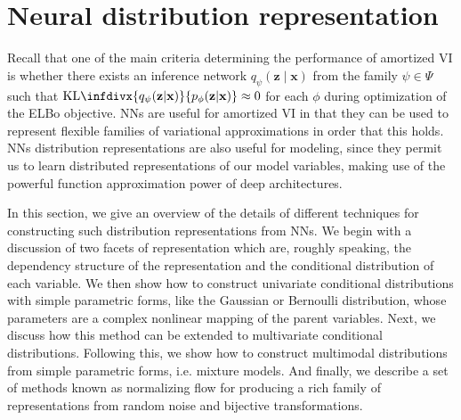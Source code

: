\section{Neural distribution representation}
Recall that one of the main criteria determining the performance of amortized VI is whether there exists an inference network $q_\psi(\mathbf{z}\mid\mathbf{x})$ from the family $\psi\in\Psi$ such that $\text{KL}\infdivx{q_\psi(\mathbf{z}|\mathbf{x})}{p_\phi(\mathbf{z}|\mathbf{x})}\approx0$ for each $\phi$ during optimization of the ELBo objective. NNs are useful for amortized VI in that they can be used to represent flexible families of variational approximations in order that this holds. NNs distribution representations are also useful for modeling, since they permit us to learn distributed representations of our model variables, making use of the powerful function approximation power of deep architectures.

In this section, we give an overview of the details of different techniques for constructing such distribution representations from NNs. We begin with a discussion of two facets of representation which are, roughly speaking, the dependency structure of the representation and the conditional distribution of each variable. We then show how to construct univariate conditional distributions with simple parametric forms, like the Gaussian or Bernoulli distribution, whose parameters are a complex nonlinear mapping of the parent variables. Next, we discuss how this method can be extended to multivariate conditional distributions. Following this, we show how to construct multimodal distributions from simple parametric forms, i.e. mixture models. And finally, we describe a set of methods known as normalizing flow for producing a rich family of representations from random noise and bijective transformations.



